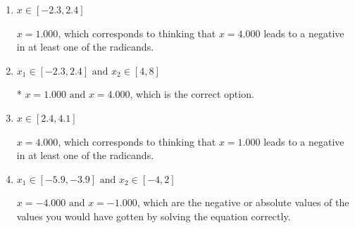 \documentclass{extbook}[14pt]
\begin{document}
\begin{enumerate}
{\begin{enumerate}[label=\Alph*.]
Corresponds to thinking that $x = 1.000 \text{ and } x = 4.000$ lead to negatives in at least one of the radicands.
\item \( x \in [-2.3,2.4] \)

$x = 1.000$, which corresponds to thinking that $x = 4.000$ leads to a negative in at least one of the radicands.
\item \( x_1 \in [-2.3, 2.4] \text{ and } x_2 \in [4,8] \)

* $x = 1.000 \text{ and } x = 4.000$, which is the correct option.
\item \( x \in [2.4,4.1] \)

$x = 4.000$, which corresponds to thinking that $x = 1.000$ leads to a negative in at least one of the radicands.
\item \( x_1 \in [-5.9, -3.9] \text{ and } x_2 \in [-4,2] \)

$x = -4.000 \text{ and } x = -1.000$, which are the negative or absolute values of the values you would have gotten by solving the equation correctly.
\end{enumerate}

}
\end{enumerate}
\end{document}
